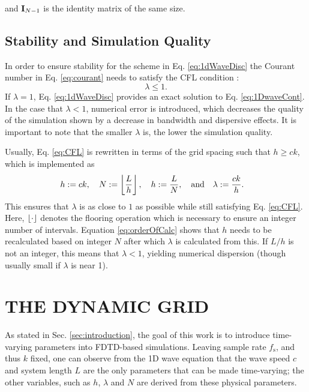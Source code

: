 \documentclass[fleqn]{jaes}
\def\SBcomment[#1]{\textcolor{red}{#1}}
\def\SWcomment[#1]{\textcolor{blue}{#1}}
\begin{document}
and $\mathbf{I}_{N-1}$ is the identity matrix of the same size. 


\subsection{Stability and Simulation Quality}\label{sec:quality}
In order to ensure stability for the scheme in Eq. \eqref{eq:1dWaveDisc} the Courant number in Eq. \eqref{eq:courant} needs to satisfy the CFL condition \cite{Courant1928}:
\begin{equation}\label{eq:CFL}
    \lambda \leq 1.
\end{equation}
%
If $\lambda = 1$, Eq. \eqref{eq:1dWaveDisc} provides an exact solution to Eq. \eqref{eq:1DwaveCont}. In the case that $\lambda < 1$, numerical error is introduced, which decreases the quality of the simulation shown by a decrease in bandwidth and dispersive effects. It is important to note that the smaller $\lambda$ is, the lower the simulation quality.

Usually, Eq. \eqref{eq:CFL} is rewritten in terms of the grid spacing such that $h \geq c k$,
which is implemented as
\begin{equation}\label{eq:orderOfCalc}
    \!\!\!\!\!h:=ck, \quad N := \floor[\frac{L}{h}],\quad h := \frac{L}{N},\qaq \lambda := \frac{ck}{h}.
\end{equation}
This ensures that $\lambda$ is as close to $1$ as possible while still satisfying Eq. \eqref{eq:CFL}. Here, $\floor[\cdot]$ denotes the flooring operation which is necessary to ensure an integer number of intervals. Equation \eqref{eq:orderOfCalc} shows that $h$ needs to be recalculated based on integer $N$ after which $\lambda$ is calculated from this. If $L/h$ is not an integer, this means that $\lambda < 1$, yielding numerical dispersion (though usually small if $\lambda$ is near 1).

\section{THE DYNAMIC GRID}\label{sec:dynamicGrid}
As stated in Sec. \ref{sec:introduction}, the goal of this work is to introduce time-varying parameters into FDTD-based simulations. 
Leaving sample rate $f_\text{s}$, and thus $k$ fixed, one can observe from the 1D wave equation that the wave speed $c$ and system length $L$ are the only parameters that can be made time-varying; the other variables, such as $h$, $\lambda$ and $N$ are derived from these physical parameters. 
\end{document}
